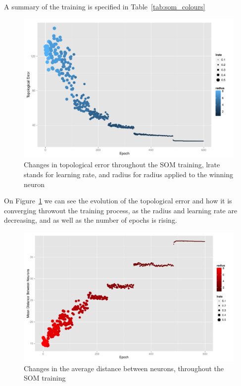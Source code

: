 \documentclass[journal]{IEEEtran}
\begin{document}


A summary of the training is specified in Table~\ref{tab:som_colours}


\begin{figure}[h]
  \centering
  \includegraphics[width=1\linewidth]{./plots/som/topological_error.pdf}
  \caption{Changes in topological error throughout the SOM training, lrate stands for learning rate, and radius for radius applied to the winning neuron}
  \label{fig:top_error}
\end{figure}

On Figure~\ref{fig:top_error} we can see the evolution of the topological error and how it is converging throwout the training process, as the radius and learning rate are decreasing, and as well as the number of epochs is rising. 

\begin{figure}[h]
  \centering
  \includegraphics[width=1\linewidth]{./plots/som/average_distance.pdf}
  \caption{Changes in the average distance between neurons, throughout the SOM training}
  \label{avg_dist}
\end{figure}
\end{document}
